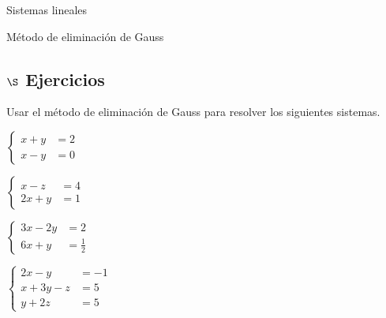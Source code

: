\begin{chapter}{Sistemas lineales}
\begin{section}{Método de eliminación de Gauss }
                \subsection*{$\S$ Ejercicios}
                \begin{enumex}
                    \item  Usar el método de eliminación de Gauss para resolver los siguientes sistemas.
                        \begin{enumex}
                            \begin{minipage}{0.4\textwidth}
                                \item \; $\begin{cases}
                                    x + y &= 2 \\
                                    x- y &= 0
                                \end{cases}$
                            \end{minipage}
                            \begin{minipage}{0.4\textwidth}
                                \item \; $\begin{cases}
                                    x - z &=4 \\
                                    2x + y &= 1
                                \end{cases}$ 
                            \end{minipage}
        
                            \begin{minipage}{0.4\textwidth}
                                \item \; $\begin{cases}
                                    3x -2y &= 2 \\
                                    6x +y  &= \displaystyle\frac12
                                \end{cases}$
                            \end{minipage}
                            \begin{minipage}{0.4\textwidth}
                               \item \; $\begin{cases}
                                    2x - y &= -1 \\
                                    x +3 y -z  &= 5 \\
                                    y+2z &= 5 
                                \end{cases}$
                            \end{minipage}


\end{enumex}
\end{enumex}
\end{section}
\end{chapter}
